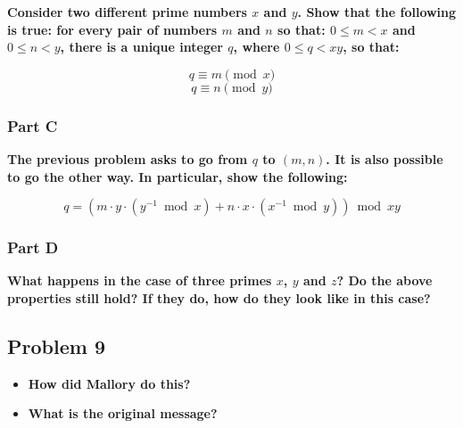 \documentclass[11pt]{article}
\begin{document}
\textbf{Consider two different prime numbers $x$ and $y$. Show that the
following is true: for every pair of numbers $m$ and $n$ so that: $0
\leq m < x$ and $0 \leq n < y$, there is a unique integer $q$, where
$0 \leq q < xy$, so that:}

$$q \equiv m \pmod{x}$$
$$q \equiv n \pmod{y}$$
  
\subsubsection*{Part C}

\textbf{The previous problem asks to go from $q$ to $(m,n)$. It is also
possible to go the other way. In particular, show the following:}

$$q = ( m \cdot y \cdot (y^{-1} \bmod{x}) + n \cdot x \cdot
(x^{-1} \bmod{y}) ) \bmod{xy}$$



\subsubsection*{Part D} 

\textbf{What happens in the case of three primes $x$, $y$ and $z$? Do the
above properties still hold? If they do, how do they look like in this
case?}

\subsection*{Problem 9}

\begin{itemize}

\item \textbf{How did Mallory do this? }

\item \textbf{What is the original message?}

\end{itemize}
\end{document}

